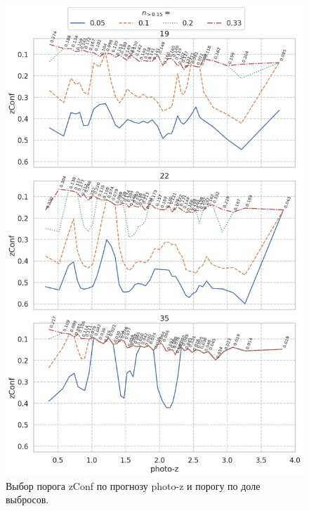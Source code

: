 \documentclass[fleqn,usenatbib]{mnras}
\begin{document}
\begin{figure}
    \centering
    \includegraphics[width=0.9\linewidth]{images/zconf-by-photo_z-x-n015.png}
    \caption{Выбор порога zConf по прогнозу photo-z и порогу по доле выбросов.}
    \label{fig:my_label}
\end{figure}
\end{document}
